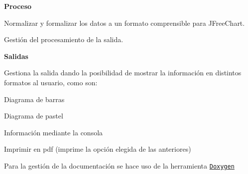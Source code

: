 {\bfseries Proceso}
\begin{DoxyItemize}
\item Normalizar y formalizar los datos a un formato comprensible para J\+Free\+Chart.
\item Gestión del procesamiento de la salida.
\end{DoxyItemize}

{\bfseries Salidas}
\begin{DoxyItemize}
\item Gestiona la salida dando la posibilidad de mostrar la información en distintos formatos al usuario, como son\+:
\begin{DoxyItemize}
\item Diagrama de barras
\item Diagrama de pastel
\item Información mediante la consola
\item Imprimir en pdf (imprime la opción elegida de las anteriores)
\end{DoxyItemize}
\end{DoxyItemize}

Para la gestión de la documentación se hace uso de la herramienta \href{http://www.stack.nl/~dimitri/doxygen/}{\tt Doxygen} 